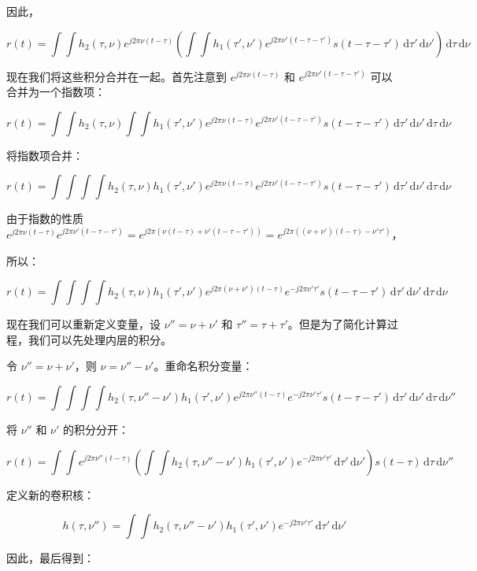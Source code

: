 \documentclass[12pt,a4paper]{article}%
\begin{document}
因此，

\[
r(t) = \int\int h_2(\tau,\nu) e^{j2\pi\nu(t-\tau)} \left( \int\int h_1(\tau',\nu') e^{j2\pi\nu'(t-\tau-\tau')} s(t-\tau-\tau') \, \mathrm{d}\tau' \, \mathrm{d}\nu' \right) \, \mathrm{d}\tau \, \mathrm{d}\nu
\]

现在我们将这些积分合并在一起。首先注意到 \( e^{j2\pi\nu(t-\tau)} \) 和 \( e^{j2\pi\nu'(t-\tau-\tau')} \) 可以合并为一个指数项：

\[
r(t) = \int\int h_2(\tau,\nu) \int\int h_1(\tau',\nu') e^{j2\pi\nu(t-\tau)} e^{j2\pi\nu'(t-\tau-\tau')} s(t-\tau-\tau') \, \mathrm{d}\tau' \, \mathrm{d}\nu' \, \mathrm{d}\tau \, \mathrm{d}\nu
\]

将指数项合并：

\[
r(t) = \int\int \int\int h_2(\tau,\nu) h_1(\tau',\nu') e^{j2\pi\nu(t-\tau)} e^{j2\pi\nu'(t-\tau-\tau')} s(t-\tau-\tau') \, \mathrm{d}\tau' \, \mathrm{d}\nu' \, \mathrm{d}\tau \, \mathrm{d}\nu
\]

由于指数的性质 \( e^{j2\pi\nu(t-\tau)} e^{j2\pi\nu'(t-\tau-\tau')} = e^{j2\pi(\nu(t-\tau) + \nu'(t-\tau-\tau'))} = e^{j2\pi((\nu + \nu')(t-\tau) - \nu'\tau')} \)，

所以：

\[
r(t) = \int\int \int\int h_2(\tau,\nu) h_1(\tau',\nu') e^{j2\pi(\nu + \nu')(t-\tau)} e^{-j2\pi\nu'\tau'} s(t-\tau-\tau') \, \mathrm{d}\tau' \, \mathrm{d}\nu' \, \mathrm{d}\tau \, \mathrm{d}\nu
\]

现在我们可以重新定义变量，设 \( \nu'' = \nu + \nu' \) 和 \( \tau'' = \tau + \tau' \)。但是为了简化计算过程，我们可以先处理内层的积分。

令 \( \nu'' = \nu + \nu' \)，则 \( \nu = \nu'' - \nu' \)。重命名积分变量：

\[
r(t) = \int\int \int\int h_2(\tau,\nu'' - \nu') h_1(\tau',\nu') e^{j2\pi\nu''(t-\tau)} e^{-j2\pi\nu'\tau'} s(t-\tau-\tau') \, \mathrm{d}\tau' \, \mathrm{d}\nu' \, \mathrm{d}\tau \, \mathrm{d}\nu''
\]

将 \(\nu''\) 和 \(\nu'\) 的积分分开：

\[
r(t) = \int \int e^{j2\pi\nu''(t-\tau)} \left( \int \int h_2(\tau,\nu'' - \nu') h_1(\tau',\nu') e^{-j2\pi\nu'\tau'} \, \mathrm{d}\tau' \, \mathrm{d}\nu' \right) s(t-\tau) \, \mathrm{d}\tau \, \mathrm{d}\nu''
\]

定义新的卷积核：

\[
h(\tau,\nu'') = \int \int h_2(\tau,\nu'' - \nu') h_1(\tau',\nu') e^{-j2\pi\nu'\tau'} \, \mathrm{d}\tau' \, \mathrm{d}\nu'
\]

因此，最后得到：
\end{document}

